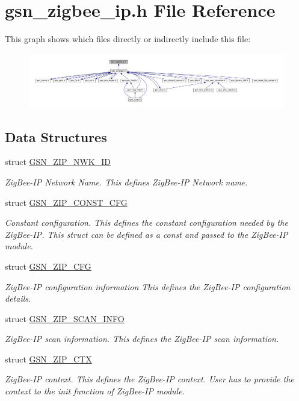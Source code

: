 \hypertarget{a00618}{
\section{gsn\_\-zigbee\_\-ip.h File Reference}
\label{a00618}
}
This graph shows which files directly or indirectly include this file:
\nopagebreak
\begin{figure}[H]
\begin{center}
\leavevmode
\includegraphics[width=400pt]{a00868}
\end{center}
\end{figure}
\subsection*{Data Structures}
\begin{DoxyCompactItemize}
\item 
struct \hyperlink{a00441}{GSN\_\-ZIP\_\-NWK\_\-ID}
\begin{DoxyCompactList}\small\item\em ZigBee-\/IP Network Name. This defines ZigBee-\/IP Network name. \end{DoxyCompactList}\item 
struct \hyperlink{a00439}{GSN\_\-ZIP\_\-CONST\_\-CFG}
\begin{DoxyCompactList}\small\item\em Constant configuration. This defines the constant configuration needed by the ZigBee-\/IP. This struct can be defined as a const and passed to the ZigBee-\/IP module. \end{DoxyCompactList}\item 
struct \hyperlink{a00438}{GSN\_\-ZIP\_\-CFG}
\begin{DoxyCompactList}\small\item\em ZigBee-\/IP configuration information This defines the ZigBee-\/IP configuration details. \end{DoxyCompactList}\item 
struct \hyperlink{a00442}{GSN\_\-ZIP\_\-SCAN\_\-INFO}
\begin{DoxyCompactList}\small\item\em ZigBee-\/IP scan information. This defines the ZigBee-\/IP scan information. \end{DoxyCompactList}\item 
struct \hyperlink{a00440}{GSN\_\-ZIP\_\-CTX}
\begin{DoxyCompactList}\small\item\em ZigBee-\/IP context. This defines the ZigBee-\/IP context. User has to provide the context to the init function of ZigBee-\/IP module. \end{DoxyCompactList}\end{DoxyCompactItemize}
